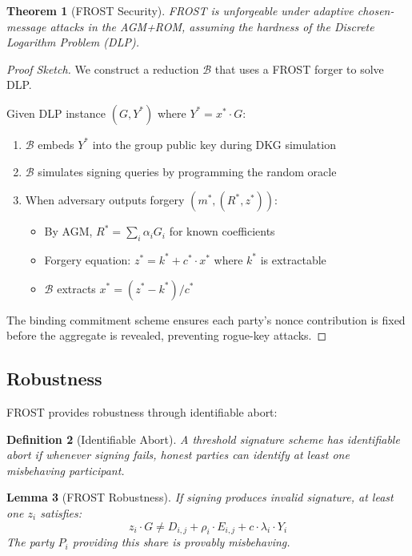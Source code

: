 \documentclass[11pt,a4paper]{article}
\newtheorem{theorem}{Theorem}[section]
\newtheorem{lemma}[theorem]{Lemma}
\newtheorem{definition}[theorem]{Definition}
\begin{document}
\begin{theorem}[FROST Security]
FROST is unforgeable under adaptive chosen-message attacks in the AGM+ROM, assuming the hardness of the Discrete Logarithm Problem (DLP).
\end{theorem}

\begin{proof}[Proof Sketch]
We construct a reduction $\mathcal{B}$ that uses a FROST forger to solve DLP.

Given DLP instance $(G, Y^*)$ where $Y^* = x^* \cdot G$:
\begin{enumerate}
    \item $\mathcal{B}$ embeds $Y^*$ into the group public key during DKG simulation
    \item $\mathcal{B}$ simulates signing queries by programming the random oracle
    \item When adversary outputs forgery $(m^*, (R^*, z^*))$:
        \begin{itemize}
            \item By AGM, $R^* = \sum_i \alpha_i G_i$ for known coefficients
            \item Forgery equation: $z^* = k^* + c^* \cdot x^*$ where $k^*$ is extractable
            \item $\mathcal{B}$ extracts $x^* = (z^* - k^*) / c^*$
        \end{itemize}
\end{enumerate}

The binding commitment scheme ensures each party's nonce contribution is fixed before the aggregate is revealed, preventing rogue-key attacks.
\end{proof}

\subsection{Robustness}

FROST provides robustness through identifiable abort:

\begin{definition}[Identifiable Abort]
A threshold signature scheme has identifiable abort if whenever signing fails, honest parties can identify at least one misbehaving participant.
\end{definition}

\begin{lemma}[FROST Robustness]
If signing produces invalid signature, at least one $z_i$ satisfies:
\[
z_i \cdot G \neq D_{i,j} + \rho_i \cdot E_{i,j} + c \cdot \lambda_i \cdot Y_i
\]
The party $P_i$ providing this share is provably misbehaving.
\end{lemma}
\end{document}
